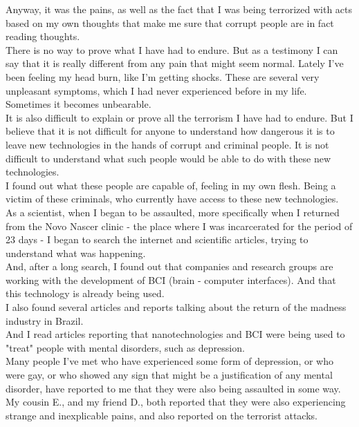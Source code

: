 \documentclass[11pt]{book}
\begin{document}
\noindent Anyway, it was the pains, as well as the fact that I was being terrorized with acts based on my own thoughts that make me sure that corrupt people are in fact reading thoughts. \\

\noindent There is no way to prove what I have had to endure. But as a testimony I can say that it is really different from any pain that might seem normal. Lately I've been feeling my head burn, like I'm getting shocks. These are several very unpleasant symptoms, which I had never experienced before in my life. Sometimes it becomes unbearable. \\

\noindent It is also difficult to explain or prove all the terrorism I have had to endure. 
But I believe that it is not difficult for anyone to understand how dangerous it is to leave new technologies in the hands of corrupt and criminal people. It is not difficult to understand what such people would be able to do with these new technologies. \\

\noindent I found out what these people are capable of, feeling in my own flesh. Being a victim of these criminals, who currently have access to these new technologies. \\

\noindent As a scientist, when I began to be assaulted, more specifically when I returned from the Novo Nascer clinic - the place where I was incarcerated for the period of 23 days - I began to search the internet and scientific articles, trying to understand what was happening. \\

\noindent And, after a long search, I found out that companies and research groups are working with the development of BCI (brain - computer interfaces). And that this technology is already being used. \\

\noindent I also found several articles and reports talking about the return of the madness industry in Brazil. \\

\noindent And I read articles reporting that nanotechnologies and BCI were being used to "treat" people with mental disorders, such as depression. \\

\noindent Many people I've met who have experienced some form of depression, or who were gay, or who showed any sign that might be a justification of any mental disorder, have reported to me that they were also being assaulted in some way. My cousin E., and my friend D., both reported that they were also experiencing strange and inexplicable pains, and also reported on the terrorist attacks. \\
\end{document}
